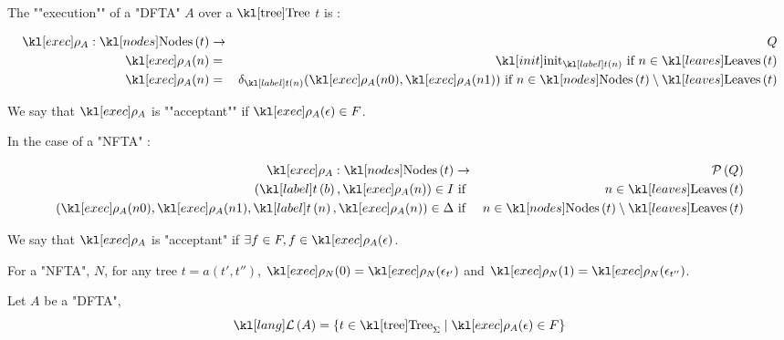 \documentclass{article}
\begin{document}
\begin{definition}
	The ""execution"" of a "DFTA" $A$ over a $\tree$ $t$ is :

	\begin{eqnarray*}
		\exec A : \nodes t &\to & Q \\
		\exec A (n)  &=& \init_{\tlabel t n} \text{ if } n \in \leaves t \\
		\exec A (n)  &=& \delta_{\tlabel t n}(\exec A (n0), \exec A (n1)) \text{ if } n \in \nodes t \setminus \leaves t
	\end{eqnarray*}

	We say that $\exec A$ is ""acceptant"" if $\exec A (\epsilon) \in F$.

	In the case of a "NFTA" :

	\begin{eqnarray*}
		\exec A : \nodes t &\to& \parts Q \\
		(\tlabel t b,  \exec A (n)) \in I &\text{ if }& n \in \leaves t \\
		(\exec A (n0), \exec A (n1), \tlabel t n, \exec A (n)) \in \Delta &\text{ if }& n \in \nodes t \setminus \leaves t
	\end{eqnarray*}

	We say that $\exec A$ is "acceptant" if $\exists f \in F, f \in \exec A (\epsilon)$.

\end{definition}

\begin{lemma}
	For a "NFTA", $N$, for any tree $t = a(t',t'')$,
	$\exec N (0) = \exec N (\epsilon_{t'})$
	and
	$\exec N (1) = \exec N (\epsilon_{t''})$.
\end{lemma}

\begin{remark}
	Let $A$ be a "DFTA",
	$$ \lang A = \setdef {t \in \tree_{\Sigma}} {\exec A (\epsilon) \in F} $$
\end{remark}
\end{document}
